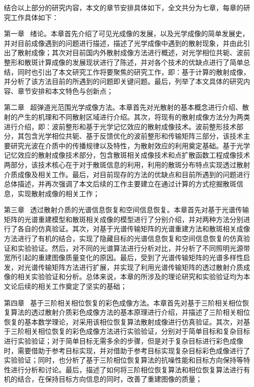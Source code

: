 结合以上部分的研究内容，本文的章节安排具体如下，全文共分为七章，每章的研究工作具体如下：

第一章 \ 绪论。本章首先介绍了可见光成像的发展，以及光学成像的简单发展史，并对目前成像遇到的问题进行描述，描述了光学成像中遇到的散射现象，并由此引出了散射成像；其次对目前国内外散射成像方法进行概述，对光学相位共轭、波前整形和散斑计算成像的发展现状进行了陈述，并对各个技术的优缺点进行了简单总结，同时也引出了本文研究工作将要聚焦的研究工作，即：基于计算的散射成像，并分析了该方法目前的所遇到的问题即关键问题。最后，列举了本文具体的研究内容、章节安排和本文特色与创新点；

第二章 \ 超弹道光范围光学成像方法。本章首先对光散射的基本概念进行介绍、散射的产生的机理和不同散射区域进行介绍。其次，将现有的散射成像方法分为两类进行介绍，即：波前整形和基于光学记忆效应的散射成像技术。波前整形技术部分，其包含光学相位共轭、基于反馈优化的波前整形和传输矩阵三部分，该技术主要研究光波在介质中的传播规律以及特性，为散射效应的利用奠定基础。基于光学记忆效应的散射成像技术部分，包含散斑相关成像技术和点扩散函数工程成像技术两部分，该技术核心在于对于散斑信息的利用，利用的散斑分布特点实现透过散射介质成像及相关工作。最后，对目前现存的方法的优缺点和目前所遇到的问题进行总体描述，并再次强调了本文后续的工作主要建立在通过计算的方式挖掘散斑信息，实现散射成像的相关工作；

第三章 \ 透过散射介质的光谱信息恢复和空间信息恢复。本章首先对基于光谱传输矩阵的光谱重建模型和散斑相关成像的模型进行了分别介绍，并对两种方法分别进行了各自的仿真验证。其次，对基于光谱传输矩阵的光谱重建方法和散斑相关成像方法进行了有机的结合，实现了隐藏目标的光谱信息恢复和空间信息恢复的仿真验证和实验验证。然后，对不同的光谱算法进行分析对比，并分析了不同照明光源带宽所引起的重建图像质量变化的原因。最后，受到了光谱传输矩阵的光谱多样性启发，对光谱传输矩阵方法进行扩展，并实现了利用光谱传输矩阵的透过散射介质成像的相关实验验证和分析。总体来说，本章的所涉及的理论研究和实验验证均为本文论后续的相关工作奠定了坚实的基础；

第四章 \ 基于三阶相关相位恢复的彩色成像方法。本章首先对基于三阶相关相位恢复算法的透过散射介质彩色成像方法的基本原理进行介绍，并描述了三阶相关相位恢复的基本数学理论，对采用该相位恢复算法散射成像进行仿真验证。其次，对基于三阶相关相位恢复的彩色成像方法进行实验验证，分别对于简单目标和复杂目标进行实验验证；对于简单目标无需多余的步骤，但是对于复杂目标进行彩色成像时，需要借助于参考目标实现，并对借助于参考目标实现复杂目标彩色成像进行了实验验证；同时，也分析了基于三阶相位恢复算法的抗噪性能和目标方向保持等特性进行分析和讨论。最后，描述了如何将三阶相位恢复算法和相位恢复算法进行有机的结合，在保持目标方向信息的同时，改善了重建图像的质量；


